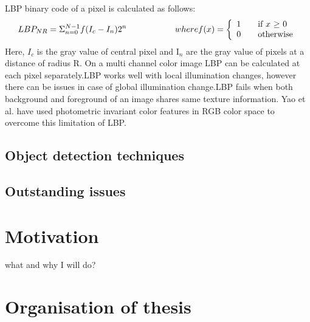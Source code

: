 LBP binary code of a pixel is calculated as follows:
\begin{equation}
LBP_{NR} = \Sigma _{n = 0} ^{N - 1} f(I_c - I_n) 2^n \hspace{20 mm} where f(x) = \left\{ 
  \begin{array}{l l}
     1 & \quad \text{if $x$ $\geq$  $0$}\\
     0 & \quad \text{otherwise}
   \end{array} \right.
\end{equation}
Here, $I_c$ is the gray value of central pixel and I$_n$ are the gray
value of pixels at a distance of radius R.  On a multi channel color
image LBP can be calculated at each pixel separately.LBP works well with
local illumination changes, however there can be issues in case of
global illumination change.LBP fails when both background and foreground
of an image shares same texture information. Yao et al. have used
photometric invariant color features in RGB color space to overcome this
limitation of LBP.

\subsection{Object detection techniques}

\subsection{Outstanding issues}

\section{Motivation}
what and why I will do?

\section{Organisation of thesis}
